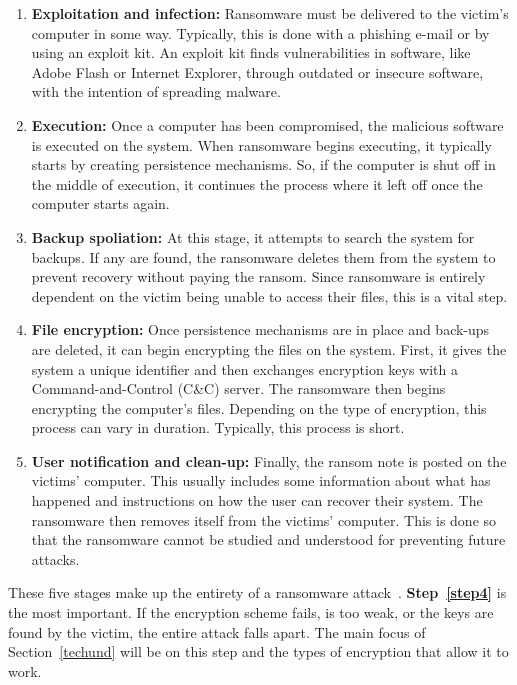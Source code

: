 \documentclass{IEEEtran}
\begin{document}
\begin{enumerate}

    \item \textbf{Exploitation and infection:} Ransomware must be delivered to the victim's computer in some way. Typically, this is done with a phishing e-mail or by using an exploit kit. An exploit kit finds vulnerabilities in software, like Adobe Flash or Internet Explorer, through outdated or insecure software, with the intention of spreading malware.
    \item \textbf{Execution:} Once a computer has been compromised, the malicious software is executed on the system. When ransomware begins executing, it typically starts by creating persistence mechanisms. So, if the computer is shut off in the middle of execution, it continues the process where it left off once the computer starts again.
    \item \textbf{Backup spoliation:} At this stage, it attempts to search the system for backups. If any are found, the ransomware deletes them from the system to prevent recovery without paying the ransom. Since ransomware is entirely dependent on the victim being unable to access their files, this is a vital step.
    \item \textbf{File encryption:}\label{step4} Once persistence mechanisms are in place and back-ups are deleted, it can begin encrypting the files on the system. First, it gives the system a unique identifier and then exchanges encryption keys with a Command-and-Control (C\&C) server. The ransomware then begins encrypting the computer's files. Depending on the type of encryption, this process can vary in duration. Typically, this process is short.
    \item \textbf{User notification and clean-up:} Finally, the ransom note is posted on the victims' computer. This usually includes some information about what has happened and instructions on how the user can recover their system. The ransomware then removes itself from the victims' computer. This is done so that the ransomware cannot be studied and understood for preventing future attacks.
\end{enumerate}


These five stages make up the entirety of a ransomware attack~\cite{RN29}. \textbf{Step~\ref{step4}} is the most important. If the encryption scheme fails, is too weak, or the keys are found by the victim, the entire attack falls apart. The main focus of Section~\ref{techund} will be on this step and the types of encryption that allow it to work.
\end{document}
